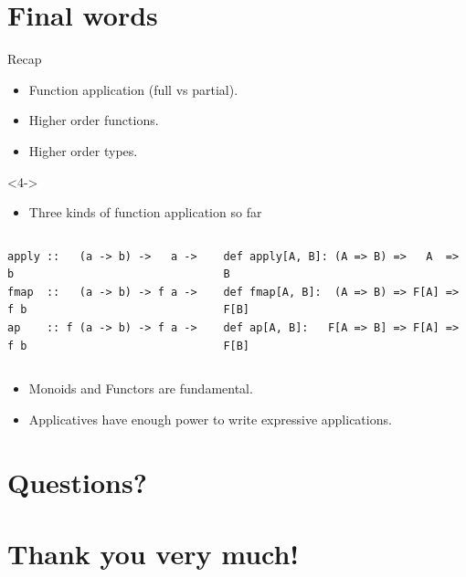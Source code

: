 \documentclass[presentation,aspectratio=169,smaller]{beamer}
\begin{document}
\section*{Final words}
\label{sec:orge02736c}
\begin{frame}[label={sec:orgd6bb75e},fragile]{Recap}
 \begin{onlyenv}
\begin{itemize}
\item <1-> Function application (full vs partial).
\item <2-> Higher order functions.
\item <3-> Higher order types.
\end{itemize}
\end{onlyenv}

\begin{onlyenv}<4->
\begin{itemize}
\item Three kinds of function application so far
\end{itemize}

\begin{columns}
\begin{column}{0.35\columnwidth}
\begin{verbatim}
apply ::   (a -> b) ->   a ->   b
fmap  ::   (a -> b) -> f a -> f b
ap    :: f (a -> b) -> f a -> f b
\end{verbatim}
\end{column}

\begin{column}{0.35\columnwidth}
\begin{verbatim}
def apply[A, B]: (A => B) =>   A  =>   B
def fmap[A, B]:  (A => B) => F[A] => F[B]
def ap[A, B]:   F[A => B] => F[A] => F[B]
\end{verbatim}
\end{column}
\end{columns}
\end{onlyenv}

\begin{onlyenv}
\begin{itemize}
\item <5-> Monoids and Functors are fundamental.
\item <6-> Applicatives have enough power to write expressive applications.
\end{itemize}
\end{onlyenv}
\end{frame}

\section{Questions?}
\label{sec:org8c91ca9}

\section{Thank you very much!}
\label{sec:orgf6b7971}
\end{document}
